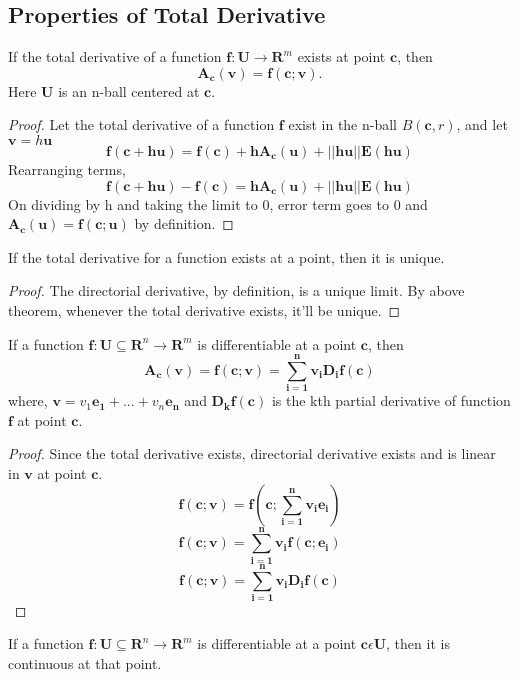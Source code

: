 \subsection{Properties of Total Derivative}
\begin{theorem}
    If the total derivative of a function $\bm{f} : \bm{U} \rightarrow \bm{R}^m$
    exists at point $\bm{c}$, then
    \[
        \bm{A_{c}(v) = f(c;v)}.
    \]
    Here $\bm{U}$ is an n-ball centered at $\bm{c}$.
\end{theorem}
\begin{proof}
    Let the total derivative of a function $\bm{f}$ exist in the n-ball
    $B(\bm{c}, r)$, and let $\bm{v} = h\bm{u}$
    \[
        \bm{f(c+\text{h}u) = f(c) + \text{h}A_c(u) + ||\text{h}u||E(\text{h}u)}
    \]
    Rearranging terms,
    \[
        \bm{f(c+\text{h}u) - f(c) = \text{h}A_c(u) + ||\text{h}u||E(\text{h}u)}
    \]
    On dividing by h and taking the limit to 0, error term goes to 0 and
    $\bm{A_c(u) = f(c;u)}$ by definition.
\end{proof}
\begin{corollary}
    If the total derivative for a function exists at a point, then it is unique.
\end{corollary}
\begin{proof}
    The directorial derivative, by definition, is a unique limit. By above
    theorem, whenever the total derivative exists, it'll be unique.
\end{proof}

\begin{theorem}
    If a function $\bm{f} : \bm{U} \subseteq \bm{R}^n \rightarrow \bm{R}^m$ is
    differentiable at a point $\bm{c}$, then
    \[
        \bm{A_c(v) = f(c;v) = \sum_{i = 1}^{n} v_i D_i f(c)}
    \]
    where, $\bm{v} = v_1\bm{e_1} +...+ v_n\bm{e_n}$ and $\bm{D_kf(c)}$ is the
    kth partial derivative of function $\bm{f}$ at point $\bm{c}$.
\end{theorem}
\begin{proof}
    Since the total derivative exists, directorial derivative exists and is linear
    in $\bm{v}$ at point $\bm{c}$.
    \[
        \bm{f(c;v) = f(c;\sum_{i=1}^{n} v_i e_i)}
    \]
    \[
        \bm{f(c;v) = \sum_{i=1}^{n} v_i f(c;e_i)}
    \]
    \[
        \bm{f(c;v) = \sum_{i=1}^{n} v_i D_if(c)}
    \]
\end{proof}
\begin{theorem}
    If a function $\bm{f} : \bm{U} \subseteq \bm{R}^n \rightarrow \bm{R}^m$ is
    differentiable at a point $\bm{c} \epsilon \bm{U}$, then it is continuous 
    at that point.
\end{theorem}

